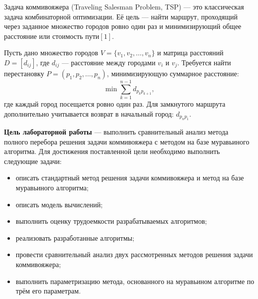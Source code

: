 \clearpage{}

Задача коммивояжера (Traveling Salesman Problem, TSP) — это классическая задача комбинаторной оптимизации. Её цель — найти маршрут, проходящий через заданное множество городов ровно один раз и минимизирующий общее расстояние или стоимость пути${[1]}$.

Пусть дано множество городов $V = \{v_1, v_2, \dots, v_n\}$ и матрица расстояний $D = [d_{ij}]$, где $d_{ij}$ — расстояние между городами $v_i$ и $v_j$. Требуется найти перестановку $P = (p_1, p_2, \dots, p_n)$, минимизирующую суммарное расстояние:
\[
\min \sum_{k=1}^{n-1} d_{p_k p_{k+1}},
\]
где каждый город посещается ровно один раз. Для замкнутого маршрута дополнительно учитывается возврат в начальный город: $d_{p_n p_1}$.

\textbf{Цель лабораторной работы} --- выполнить сравнительный анализ метода
полного перебора решения задачи коммивояжера с методом на базе муравьиного алгоритма. Для достижения
поставленной цели необходимо выполнить следующие задачи:

\begin{itemize}
	\item[---] описать стандартный метод решения задачи коммивояжера и метод на базе муравьиного алгоритма;
	\item[---] описать модель вычислений;
    \item[---] выполнить оценку трудоемкости разрабатываемых алгоритмов;
    \item[---] реализовать разработанные алгоритмы;
    \item[---] провести сравнительный анализ двух рассмотренных методов решения задачи коммивояжера;
    \item[---] выполнить параметризацию метода, основанного на муравьином алгоритме по трём его параметрам.
\end{itemize}